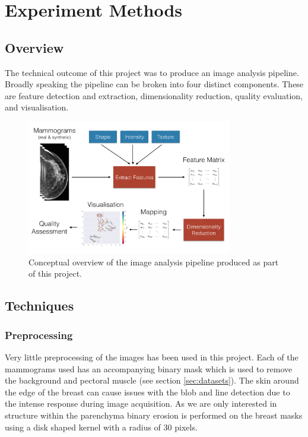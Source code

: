 \chapter{Experiment Methods}

\section{Overview}

The technical outcome of this project was to produce an image analysis pipeline. Broadly speaking the pipeline can be broken into four distinct components. These are feature detection and extraction, dimensionality reduction, quality evaluation, and visualisation.


\begin{figure}
	\label{fig:pipeline-diagram}
	\centering
	\includegraphics[width=0.8\textwidth]{Images/pipeline-diagram.png}	
	\caption{Conceptual overview of the image analysis pipeline produced as part of this project.}
\end{figure}

\section{Techniques}

\subsection{Preprocessing}
Very little preprocessing of the images has been used in this project. Each of the mammograms used has an accompanying binary mask which is used to remove the background and pectoral muscle (see section \ref{sec:datasets}). The skin around the edge of the breast can cause issues with the blob and line detection due to the intense response during image acquisition. As we are only interested in structure within the parenchyma binary erosion is performed on the breast masks using a disk shaped kernel with a radius of 30 pixels.


